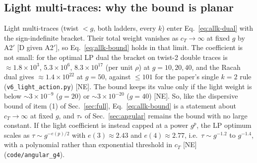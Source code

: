 \subsection{Light multi-traces: why the bound is planar}
\label{sec:allk-planar}
Light multi-traces (twist $<g$, both ladders, every $k$) enter Eq.~\eqref{eq:allk-dual} with the sign-indefinite bracket. Their total weight
vanishes as $c_T\to\infty$ at fixed $g$ by A2$'$ [D given A2$'$], so Eq.~\eqref{eq:allk-bound} holds in that limit. The coefficient is
not small: for the optimal LP dual the bracket on twist-2 double traces is $\approx1.8\times10^3$, $5.3\times10^6$, $8.3\times10^{17}$ (per unit
$\rho$) at $g=10,20,40$, and the Racah dual gives $\approx1.4\times10^{22}$ at $g=50$, against $\le101$ for the paper's single $k=2$ rule
(\texttt{v6\_light\_action.py}) [NE]. The bound keeps its value only if the light weight is below $\sim3\times10^{-9}$ ($g=20$) or
$\sim3\times10^{-20}$ ($g=40$) [NE]. So, like the dispersive bound of item (1) of Sec.~\ref{sec:full}, Eq.~\eqref{eq:allk-bound} is a statement about $c_T\to\infty$ at fixed
$g$, and $\tau_*$ of Sec.~\ref{sec:angular} remains the bound with no large constant. If the light coefficient is instead capped at a power $g^p$, the LP
optimum scales as $\tau\sim g^{-e(p)/2}$ with $e(3)\approx2.43$ and $e(4)\approx2.77$, i.e.\ $\tau\sim g^{-1.2}$ to $g^{-1.4}$, with a polynomial
rather than exponential threshold in $c_T$ [NE] (\texttt{code/angular\_g4}).
